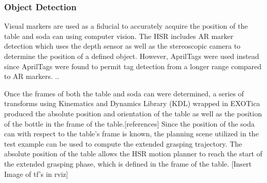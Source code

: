 \documentclass[12pt]{article}
\begin{document}
            \subsubsection{Object Detection}
                Visual markers are used as a fiducial to accurately acquire the position of the table and soda can using computer vision.
                The HSR includes AR marker detection which uses the depth sensor as well as the stereoscopic camera to determine the position of a defined object. However, AprilTags were used instead since AprilTags were found to permit tag detection from a longer range compared to AR markers. \cite{wang_apriltag_2016}.. 

                \par Once the frames of both the table and soda can were determined, a series of transforms using Kinematics and Dynamics Library (KDL)\cite{noauthor_kinematics_nodate} wrapped in EXOTica produced the absolute position and orientation of the table as well as the position of the bottle in the frame of the table.[references] Since the position of the soda can with respect to the table's frame is known, the planning scene utilized in the test example can be used to compute the extended grasping trajectory.
                 The absolute position of the table allows the HSR motion planner to reach the start of the extended grasping phase, which is defined in the frame of the table. [Insert Image of tf's in rviz]
\end{document}
